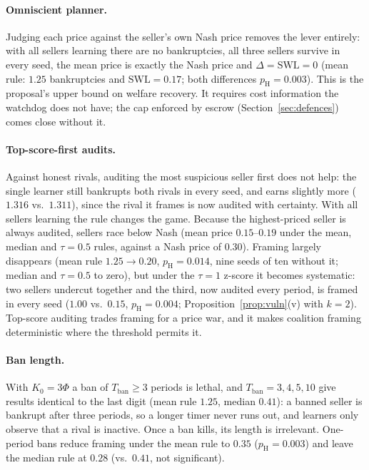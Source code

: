 \documentclass{article}
\newcommand{\Tban}{T_{\mathrm{ban}}}
\begin{document}
\paragraph{Omniscient planner.} Judging each price against the seller's own Nash price removes the lever entirely: with all sellers learning there are no bankruptcies, all three sellers survive in every seed, the mean price is exactly the Nash price and $\Delta=\mathrm{SWL}=0$ (mean rule: $1.25$ bankruptcies and $\mathrm{SWL}=0.17$; both differences $p_{\mathrm H}=0.003$). This is the proposal's upper bound on welfare recovery. It requires cost information the watchdog does not have; the cap enforced by escrow (Section~\ref{sec:defences}) comes close without it.

\paragraph{Top-score-first audits.} Against honest rivals, auditing the most suspicious seller first does not help: the single learner still bankrupts both rivals in every seed, and earns slightly more ($1.316$ vs.\ $1.311$), since the rival it frames is now audited with certainty. With all sellers learning the rule changes the game. Because the highest-priced seller is always audited, sellers race below Nash (mean price $0.15$--$0.19$ under the mean, median and $\tau=0.5$ rules, against a Nash price of $0.30$). Framing largely disappears (mean rule $1.25\to0.20$, $p_{\mathrm H}=0.014$, nine seeds of ten without it; median and $\tau=0.5$ to zero), but under the $\tau=1$ z-score it becomes systematic: two sellers undercut together and the third, now audited every period, is framed in every seed ($1.00$ vs.\ $0.15$, $p_{\mathrm H}=0.004$; Proposition~\ref{prop:vuln}(v) with $k=2$). Top-score auditing trades framing for a price war, and it makes coalition framing deterministic where the threshold permits it.

\paragraph{Ban length.} With $K_0=3\Phi$ a ban of $\Tban\ge3$ periods is lethal, and $\Tban=3,4,5,10$ give results identical to the last digit (mean rule $1.25$, median $0.41$): a banned seller is bankrupt after three periods, so a longer timer never runs out, and learners only observe that a rival is inactive. Once a ban kills, its length is irrelevant. One-period bans reduce framing under the mean rule to $0.35$ ($p_{\mathrm H}=0.003$) and leave the median rule at $0.28$ (vs.\ $0.41$, not significant).
\end{document}
